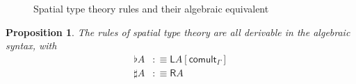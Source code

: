 \documentclass[10pt]{article}
\newtheorem{proposition}{Proposition}
\theoremstyle{definition}
\newcommand{\id}{\mathsf{id}}
\newcommand\proj[1]{\ensuremath{\mathsf{proj}_{#1}}}
\newcommand{\lock}{\text{\faUnlock}}
\newcommand{\Rtype}[1]{\mathsf{R}{#1}}
\newcommand{\Ltype}[1]{\mathsf{L}{#1}}
\newcommand{\counit}[1]{\mathsf{counit}_{#1}}
\newcommand{\comult}[1]{\mathsf{comult}_{#1}}
\newcommand{\Flattype}[1]{\flat{#1}}
\newcommand{\FlatI}[1]{{#1}^\flat}
\newcommand{\FlatE}[1]{\mathsf{letflat}({#1})}
\newcommand{\Sharptype}[1]{\sharp{#1}}
\newcommand{\SharpI}[1]{{#1}^\sharp}
\newcommand{\SharpE}[1]{{#1}_\sharp}
\begin{document}
\begin{figure}
\begin{mathpar}
\end{mathpar}
\caption{Spatial type theory rules and their algebraic equivalent}\label{fig:qit-spatial-rules}
\end{figure}

\begin{proposition}
The rules of spatial type theory are all derivable in the algebraic syntax, with
\begin{align*}
\Flattype{A} &:\equiv \Ltype{A}[\comult{\Gamma}] \\
\Sharptype{A} &:\equiv \Rtype{A}
\end{align*}
\end{proposition}
\end{document}
